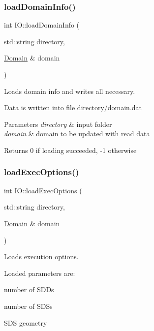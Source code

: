 \subsubsection{\texorpdfstring{load\+Domain\+Info()}{loadDomainInfo()}}
{\footnotesize\ttfamily int I\+O\+::load\+Domain\+Info (\begin{DoxyParamCaption}\item[{std\+::string}]{directory,  }\item[{\hyperlink{classDomain}{Domain} \&}]{domain }\end{DoxyParamCaption})}



Loads domain info and writes all necessary. 

Data is written into file directory/domain.\+dat


\begin{DoxyParams}{Parameters}
{\em directory} & input folder \\
\hline
{\em domain} & domain to be updated with read data\\
\hline
\end{DoxyParams}
\begin{DoxyReturn}{Returns}
0 if loading succeeded, -\/1 otherwise 
\end{DoxyReturn}
\mbox{\label{namespaceIO_ae9baa8f2d704798ba4b669718c5630c6}} 
\subsubsection{\texorpdfstring{load\+Exec\+Options()}{loadExecOptions()}}
{\footnotesize\ttfamily int I\+O\+::load\+Exec\+Options (\begin{DoxyParamCaption}\item[{std\+::string}]{directory,  }\item[{\hyperlink{classDomain}{Domain} \&}]{domain }\end{DoxyParamCaption})}



Loads execution options. 

Loaded parameters are\+:
\begin{DoxyItemize}
\item number of S\+D\+Ds
\item number of S\+D\+Ss
\item S\+DS geometry
\end{DoxyItemize}


